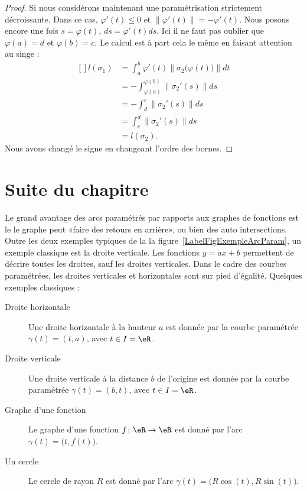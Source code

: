 \begin{proof}
    Si nous considérons maintenant une paramétrisation strictement décroissante. Dans ce cas, $\varphi'(t)\leq 0$ et $\| \varphi'(t) \|=-\varphi'(t)$. Nous posons encore une fois $s=\varphi(t)$, $ds=\varphi'(t)ds$. Ici il ne faut pas oublier que $\varphi(a)=d$ et $\varphi(b)=c$. Le calcul est à part cela le même en faisant attention au singe :
    \begin{equation}
        \begin{aligned}[]
            l(\sigma_1)&=\int_a^b\varphi'(t)\| \sigma_2\big( \varphi(t) \big) \|dt\\
            &=-\int_{\varphi(a)}^{\varphi(b)}\| \sigma_2'(s) \|ds\\
            &=-\int_d^c\| \sigma_2'(s) \|ds\\
            &=\int_c^d\| \sigma_2'(s) \|ds\\
            &=l(\sigma_2).
        \end{aligned}
    \end{equation}
    Nous avons changé le signe en changeant l'ordre des bornes.
\end{proof}

\section{Suite du chapitre}

Le grand avantage des arcs paramétrés par rapports aux graphes de fonctions est le le graphe peut «faire des retours en arrière», ou bien des auto intersections. Outre les deux exemples typiques de la la figure~\ref{LabelFigExempleArcParam}, un exemple classique est la droite verticale. Les fonctions $y=ax+b$ permettent de décrire toutes les droites, sauf les droites verticales. Dans le cadre des courbes paramétrées, les droites verticales et horizontales sont sur pied d'égalité. Quelques exemples classiques :
\begin{description}
    \item[Droite horizontale] Une droite horizontale à la hauteur $a$ est donnée par la courbe paramétrée $\gamma(t)=(t,a)$, avec $t\in I=\eR$.
    \item[Droite verticale] Une droite verticale à la distance $b$ de l'origine est donnée par la courbe paramétrée $\gamma(t)=(b,t)$, avec $t\in I=\eR$.
    \item[Graphe d'une fonction]\label{PgGrqFnGamma} Le graphe d'une fonction $f\colon \eR\to \eR$ est donné par l'arc $\gamma(t)=\big( t,f(t) \big)$.
    \item[Un cercle] Le cercle de rayon $R$ est donné par l'arc $\gamma(t)=\big( R\cos(t),R\sin(t) \big)$.
\end{description}

